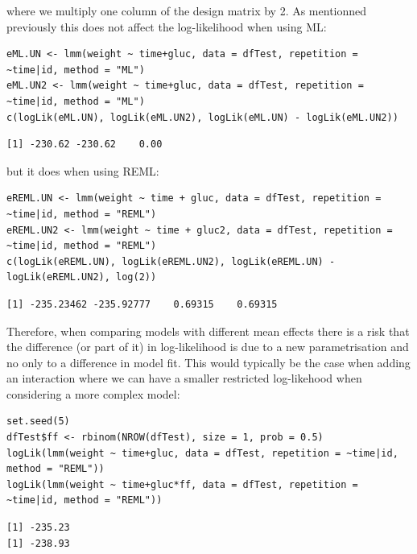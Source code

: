 \documentclass[12pt]{article}
\begin{document}
\noindent where we multiply one column of the design matrix by 2. As mentionned
previously this does not affect the log-likelihood when using ML:
\lstset{language=r,label= ,caption= ,captionpos=b,numbers=none}
\begin{lstlisting}
eML.UN <- lmm(weight ~ time+gluc, data = dfTest, repetition = ~time|id, method = "ML")
eML.UN2 <- lmm(weight ~ time+gluc, data = dfTest, repetition = ~time|id, method = "ML")
c(logLik(eML.UN), logLik(eML.UN2), logLik(eML.UN) - logLik(eML.UN2))
\end{lstlisting}

\begin{verbatim}
[1] -230.62 -230.62    0.00
\end{verbatim}


but it does when using REML:
\lstset{language=r,label= ,caption= ,captionpos=b,numbers=none}
\begin{lstlisting}
eREML.UN <- lmm(weight ~ time + gluc, data = dfTest, repetition = ~time|id, method = "REML")
eREML.UN2 <- lmm(weight ~ time + gluc2, data = dfTest, repetition = ~time|id, method = "REML")
c(logLik(eREML.UN), logLik(eREML.UN2), logLik(eREML.UN) - logLik(eREML.UN2), log(2))
\end{lstlisting}

\begin{verbatim}
[1] -235.23462 -235.92777    0.69315    0.69315
\end{verbatim}



Therefore, when comparing models with different mean effects there is
a risk that the difference (or part of it) in log-likelihood is due to
a new parametrisation and no only to a difference in model fit. This
would typically be the case when adding an interaction where we can
have a smaller restricted log-likehood when considering a more complex
model:

\lstset{language=r,label= ,caption= ,captionpos=b,numbers=none}
\begin{lstlisting}
set.seed(5) 
dfTest$ff <- rbinom(NROW(dfTest), size = 1, prob = 0.5)
logLik(lmm(weight ~ time+gluc, data = dfTest, repetition = ~time|id, method = "REML"))
logLik(lmm(weight ~ time+gluc*ff, data = dfTest, repetition = ~time|id, method = "REML"))
\end{lstlisting}

\begin{verbatim}
[1] -235.23
[1] -238.93
\end{verbatim}
\end{document}
